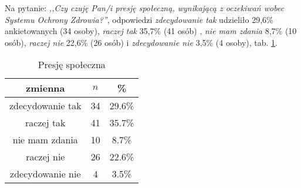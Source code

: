 
Na pytanie: \textit{,,Czy czuję Pan/i presję społeczną, wynikającą z oczekiwań wobec Systemu Ochrony Zdrowia?''}, odpowiedzi \textit{zdecydowanie tak} udzieliło 29,6\% ankietowanych (34 osoby), \textit{raczej tak} 35,7\% (41 osób) , \textit{nie mam zdania} 8,7\% (10 osób), \textit{raczej nie} 22,6\% (26 osób) i \textit{zdecydowanie nie} 3,5\% (4 osoby), tab. \ref{tab:Q15}.

\begin{table}[H]
\caption{Presję społeczna}
\centering
\begin{tabular}{ | c | c | c |}
\hline
zmienna & $n$ & \% \\
\hline
zdecydowanie tak  &  34  & 29.6\% \\
\hline
raczej tak  &  41  & 35.7\% \\
\hline
nie mam zdania  &  10  & 8.7\% \\
\hline
raczej nie  &  26  & 22.6\% \\
\hline
zdecydowanie nie  &  4  & 3.5\% \\
\hline
\end{tabular}
\label{tab:Q15}
\end{table}
